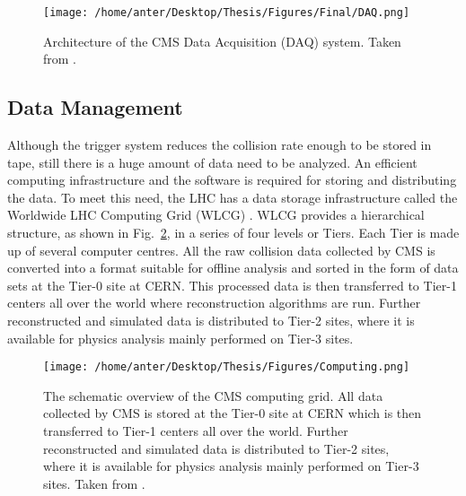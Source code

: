 \begin{figure}[!h]
\begin{center}
\vspace*{1mm} 
\hspace*{-5mm}
\texttt{[image: /home/anter/Desktop/Thesis/Figures/Final/DAQ.png]}\\
\vspace*{2mm}
\caption[Architecture of the CMS Data Acquisition (DAQ) system.]{Architecture of the CMS Data Acquisition (DAQ) system. Taken from \cite{Chatrchyan:2008aa}.}
\label{fig:DAQ}
\end{center}
\end{figure}

\subsection{Data Management}
Although the trigger system reduces the collision rate enough to be stored in tape, still there is a huge amount of data need to be analyzed. An efficient computing infrastructure and the software is required for storing and distributing the data. To meet this need, the LHC has a data storage infrastructure called the Worldwide LHC Computing Grid (WLCG) \cite{Bird:2005js}. WLCG provides a hierarchical structure, as shown in Fig.~\ref{fig:Computing}, in a series of four levels or Tiers. Each Tier is made up of several computer centres. All the raw collision data collected by CMS is converted into a format suitable for offline analysis and sorted in the form of data sets at the Tier-0 site at CERN. This processed data is then transferred to Tier-1 centers all over the world where reconstruction algorithms are run. Further reconstructed and simulated data is distributed to Tier-2 sites, where it is available for physics analysis mainly performed on Tier-3 sites. %

\begin{figure}[!h]
\begin{center}
\vspace*{3mm} 
\hspace*{-5mm}
\texttt{[image: /home/anter/Desktop/Thesis/Figures/Computing.png]}\\
\vspace*{4mm}
\caption[The schematic overview of the CMS computing grid.]{The schematic overview of the CMS computing grid. All data collected by CMS is stored at the Tier-0 site at CERN which is then transferred to Tier-1 centers all over the world. Further reconstructed and simulated data is distributed to Tier-2 sites, where it is available for physics analysis mainly performed on Tier-3 sites. Taken from \cite{Bird:2005js}.}
\label{fig:Computing}
\end{center}
\end{figure}

